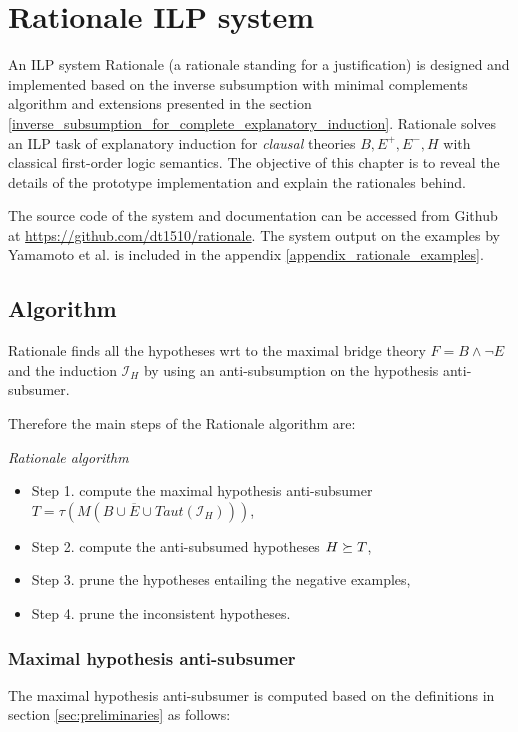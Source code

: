 \chapter{Rationale ILP system}\label{chap:rationale_ilp_system}
An ILP system Rationale (a rationale standing for a justification) is designed and implemented based on the inverse subsumption with minimal complements algorithm and extensions presented in the section \ref{inverse_subsumption_for_complete_explanatory_induction}. Rationale solves an ILP task of explanatory induction for \emph{clausal} theories $B, E^+, E^-, H$ with classical first-order logic semantics. The objective of this chapter is to reveal the details of the prototype implementation and explain the rationales behind.

The source code of the system and documentation can be accessed from Github at 
\url{https://github.com/dt1510/rationale}. The system output on the examples by Yamamoto et al. \cite{yamamoto2012inverse} is included in the appendix \ref{appendix_rationale_examples}.

\section{Algorithm}
Rationale finds all the hypotheses wrt to the maximal bridge theory $F=B \land \neg E$ and the induction $\mathcal{I}_H$ by using an anti-subsumption on the hypothesis anti-subsumer.

Therefore the main steps of the Rationale algorithm are:
\begin{algorithm}\emph{Rationale algorithm}
\begin{itemize}
\item Step 1. compute the maximal hypothesis anti-subsumer
$T=\tau(M(B \cup \overline{E} \cup Taut(\mathcal{I}_H)))$,
\item Step 2. compute the anti-subsumed hypotheses $H \succeq T$,
\item Step 3. prune the hypotheses entailing the negative examples,
\item Step 4. prune the inconsistent hypotheses.
\end{itemize}
\end{algorithm}

\subsection{Maximal hypothesis anti-subsumer}
The maximal hypothesis anti-subsumer is computed based on the definitions in section \ref{sec:preliminaries} as follows:


